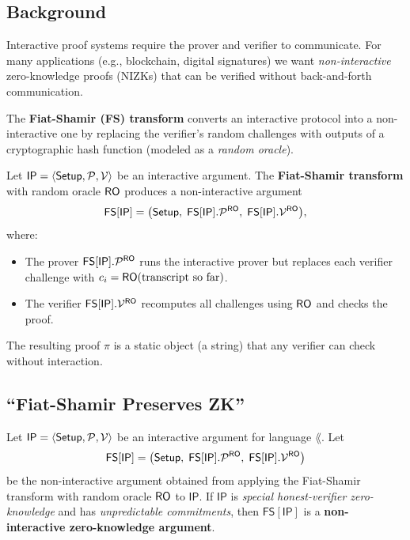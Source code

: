 \documentclass[11pt]{article}
\begin{document}
\subsection{Background}

Interactive proof systems require the prover and verifier to
communicate.  For many applications (e.g., blockchain, digital
signatures) we want \emph{non-interactive} zero-knowledge proofs
(NIZKs) that can be verified without back-and-forth communication.

The \textbf{Fiat-Shamir (FS) transform} converts an interactive
protocol into a non-interactive one by replacing the verifier's
random challenges with outputs of a cryptographic hash function
(modeled as a \emph{random oracle}).

\begin{tcolorbox}[colback=blue!5!white, colframe=blue!60!black,
                  title={Fiat-Shamir Transform}]
Let $\mathsf{IP} = \langle \mathsf{Setup}, \mathcal{P}, \mathcal{V} \rangle$ be an interactive
argument.  The \textbf{Fiat-Shamir transform} with random oracle
$\mathsf{RO}$ produces a non-interactive argument
\[
  \mathsf{FS[IP]} = \bigl(\mathsf{Setup},\; \mathsf{FS[IP]}.\mathcal{P}^{\mathsf{RO}},\;
  \mathsf{FS[IP]}.\mathcal{V}^{\mathsf{RO}}\bigr),
\]
where:
\begin{itemize}
  \item The prover $\mathsf{FS[IP]}.\mathcal{P}^{\mathsf{RO}}$ runs the
        interactive prover but replaces each verifier challenge with
        $c_i = \mathsf{RO}(\text{transcript so far})$.
  \item The verifier $\mathsf{FS[IP]}.\mathcal{V}^{\mathsf{RO}}$ recomputes
        all challenges using $\mathsf{RO}$ and checks the proof.
\end{itemize}
The resulting proof $\pi$ is a static object (a string) that any
verifier can check without interaction.
\end{tcolorbox}

\subsection{``Fiat-Shamir Preserves ZK''}

\begin{theorem}
Let $\mathsf{IP} = \langle \mathsf{Setup}, \mathcal{P}, \mathcal{V} \rangle$ be an interactive
argument for language $\lang$.  Let
\[
  \mathsf{FS[IP]} = \bigl(\mathsf{Setup},\; \mathsf{FS[IP]}.\mathcal{P}^{\mathsf{RO}},\;
  \mathsf{FS[IP]}.\mathcal{V}^{\mathsf{RO}}\bigr)
\]
be the non-interactive argument obtained from applying the Fiat-Shamir
transform with random oracle $\mathsf{RO}$ to $\mathsf{IP}$.  If
$\mathsf{IP}$ is \emph{special honest-verifier zero-knowledge} and
has \emph{unpredictable commitments}, then $\mathsf{FS[IP]}$ is a
\textbf{non-interactive zero-knowledge argument}.
\end{theorem}
\end{document}
